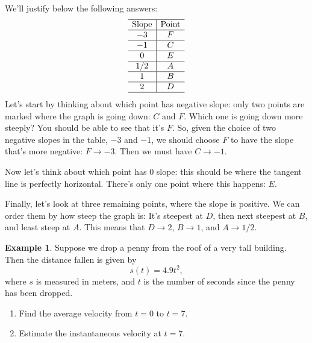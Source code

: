 \documentclass[oneside]{book}
\theoremstyle{definition}
\newtheorem{example}{Example}
\theoremstyle{solution}
\newtheorem*{solution}{Solution}
\newenvironment{solution}{\vspace{2in}\comment}{\endcomment}
\begin{document}
\begin{solution}
We'll justify below the following answers:
$$
\begin{array}{c|c}\hline
\text{Slope} &  \text{Point} \\ \hline
-3  & F     \\ \hline
-1  & C     \\ \hline
0   & E     \\ \hline
1/2 & A     \\ \hline
1   & B     \\ \hline
2   & D     \\ \hline
\end{array}
$$
Let's start by thinking about which point has negative slope: only two
points are marked where the graph is going down: $C$ and $F$.  Which
one is going down more steeply?  You should be able to see that it's
$F$.  So, given the choice of two negative slopes in the table, $-3$
and $-1$, we should choose $F$ to have the slope that's more negative:
$F \to -3$.  Then we must have $C\to -1$.

Now let's think about which point has $0$ slope: this should be where
the tangent line is perfectly horizontal.  There's only one point
where this happens: $E$.  

Finally, let's look at three remaining points, where the slope is
positive.  We can order them by how steep the graph is: It's steepest
at $D$, then next steepest at $B$, and least steep at $A$.  This means
that $D\to 2$, $B\to 1$, and $A\to 1/2$.  
\end{solution}


\begin{example}
Suppose we drop a penny from the roof of a very tall building.  Then
the distance fallen is given by
$$
s(t) = 4.9t^2,
$$
where $s$ is measured in meters, and $t$ is the number of seconds
since the penny has been dropped.  
\begin{enumerate}
\item Find the average velocity from $t=0$ to $t=7$.
\item Estimate the instantaneous velocity at $t=7$.
\end{enumerate}
\end{example}
\end{document}
